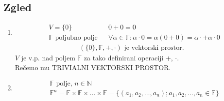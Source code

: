 \subsection{Zgled}
\begin{enumerate}[label=\alph*)]
    \item 
    \begin{align*}
        &V = \{0\} && 0 + 0 = 0 \\
        &\mathbb{F} \text{ poljubno polje} && \forall \alpha \in \mathbb{F}: \alpha \cdot 0 = \alpha (0 + 0) = \alpha \cdot + \alpha \cdot 0
    \end{align*}
    \begin{align*}
        (\{0\},\mathbb{F}, +, \cdot) \text{ je vektorski prostor.}
    \end{align*}
    $V$ je v.p. nad poljem $\mathbb{F}$  za tako definirani operaciji $+$, $\cdot$. \\
    Rečemo mu TRIVIALNI VEKTORSKI PROSTOR.
    \item 
    \begin{align*}
        &\mathbb{F} \text{ polje, } n \in \mathbb{N} \\    
        &\mathbb{F}^{n} = \mathbb{F} \times \mathbb{F} \times \dots \times \mathbb{F} = \{(a_1, a_2, \dots, a_n); a_1, a_2, \dots, a_n \in \mathbb{F}\} 
    \end{align*}
\end{enumerate}
